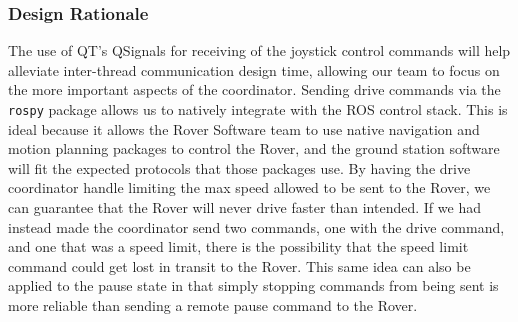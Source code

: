 \subsubsection{Design Rationale}
The use of QT's QSignals for receiving of the joystick control commands will help alleviate inter-thread communication design time, allowing our team to focus on the more important aspects of the coordinator.
Sending drive commands via the \texttt{rospy} package allows us to natively integrate with the ROS control stack.
This is ideal because it allows the Rover Software team to use native navigation and motion planning packages to control the Rover, and the ground station software will fit the expected protocols that those packages use.
By having the drive coordinator handle limiting the max speed allowed to be sent to the Rover, we can guarantee that the Rover will never drive faster than intended.
If we had instead made the coordinator send two commands, one with the drive command, and one that was a speed limit, there is the possibility that the speed limit command could get lost in transit to the Rover.
This same idea can also be applied to the pause state in that simply stopping commands from being sent is more reliable than sending a remote pause command to the Rover.
